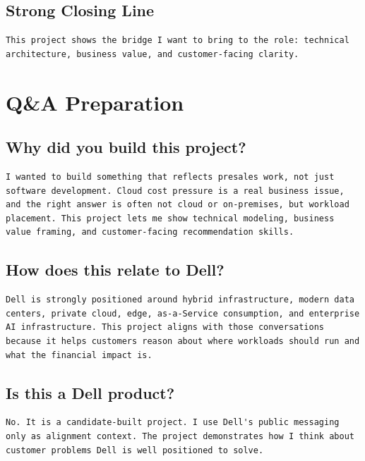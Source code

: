 \documentclass[11pt,a4paper]{article}
\begin{document}
\subsection{Strong Closing Line}

\begin{lstlisting}
This project shows the bridge I want to bring to the role: technical architecture, business value, and customer-facing clarity.
\end{lstlisting}

\section{Q\&A Preparation}

\subsection{Why did you build this project?}

\begin{lstlisting}
I wanted to build something that reflects presales work, not just software development. Cloud cost pressure is a real business issue, and the right answer is often not cloud or on-premises, but workload placement. This project lets me show technical modeling, business value framing, and customer-facing recommendation skills.
\end{lstlisting}

\subsection{How does this relate to Dell?}

\begin{lstlisting}
Dell is strongly positioned around hybrid infrastructure, modern data centers, private cloud, edge, as-a-Service consumption, and enterprise AI infrastructure. This project aligns with those conversations because it helps customers reason about where workloads should run and what the financial impact is.
\end{lstlisting}

\subsection{Is this a Dell product?}

\begin{lstlisting}
No. It is a candidate-built project. I use Dell's public messaging only as alignment context. The project demonstrates how I think about customer problems Dell is well positioned to solve.
\end{lstlisting}
\end{document}
